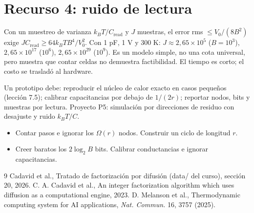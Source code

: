 \documentclass[11pt,a4paper]{article}
\begin{document}
\section{Recurso 4: ruido de lectura}
Con un muestreo de varianza $k_BT/C_{\text{read}}$ y $J$ muestras, el error rms $\le V_0/(8B^2)$ exige $JC_{\text{read}}\ge64k_BTB^4/V_0^2$. Con 1 pF, 1 V y 300 K:
$J\approx2{,}65\times10^5$ ($B=10^3$), $2{,}65\times10^{17}$ ($10^6$), $2{,}65\times10^{29}$ ($10^9$). Es un modelo simple, no una cota universal, pero muestra que contar celdas
no demuestra factibilidad. El tiempo es corto; el costo se trasladó al hardware.

\begin{aplicacion}
Un prototipo debe: reproducir el núcleo de calor exacto en casos pequeños (lección 7.5); calibrar capacitancias por debajo de $1/(2r)$; reportar nodos, bits y
muestras por lectura. Proyecto P5: simulación por direcciones de residuo con desajuste y ruido $k_BT/C$.
\end{aplicacion}

\begin{error}
\begin{itemize}[nosep]
\item Contar pasos e ignorar los $\Omega(r)$ nodos. \quad Construir un ciclo de longitud $r$.
\item Creer baratos los $2\log_2B$ bits. \quad Calibrar conductancias e ignorar capacitancias.
\end{itemize}
\end{error}

\begin{thebibliography}{9}\small
{} Cadavid et al., Tratado de factorización por difusión (data/ del curso), sección 20, 2026.
 C. A. Cadavid et al., An integer factorization algorithm which uses diffusion as a computational engine, 2023.
 D. Melanson et al., Thermodynamic computing system for AI applications, \emph{Nat. Commun.} 16, 3757 (2025).
\end{thebibliography}
\end{document}
